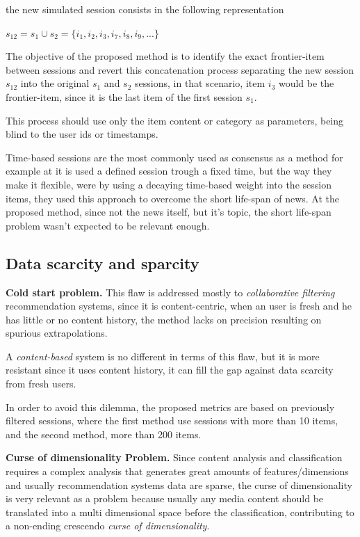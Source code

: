 \documentclass[ecp,tc,english]{iiufrgs}
\begin{document}
        the new simulated session consists in the following representation
    
        \(s_{12} =  s_{1} \cup  s_{2} =  \{i_{1}, i_{2}, i_{3}, i_{7}, i_{8}, i_{9}, ...\}\)
    
        The objective of the proposed method is to identify the exact frontier-item between sessions and revert this concatenation process separating the new session  \(s_{12}\) into the original \(s_{1}\) and \(s_{2}\) sessions, in that scenario, item \(i_{3}\) would be the frontier-item, since it is the last item of the first session \(s_{1}\).
    
        This process should use only the item content or category as parameters, being blind to the user ids or timestamps.
        
        Time-based sessions are the most commonly used as consensus as a method for example at \cite{sottocornola2018} it is used a defined session trough a fixed time, but the way they make it flexible, were by using a decaying time-based weight into the session items, they used this approach to overcome the short life-span of news. At the proposed method, since not the news itself, but it's topic, the short life-span problem wasn't expected to be relevant enough.
    
        \subsection{Data scarcity and sparcity} \label{data_scarcity_and_sparcity}
        \textbf{Cold start problem.} This flaw is addressed mostly to \textit{collaborative filtering} recommendation systems, since it is content-centric, when an user is fresh and he has little or no content history, the method lacks on precision resulting on spurious extrapolations.
    
        A \textit{content-based} system is no different in terms of this flaw, but it is more resistant since it uses content history, it can fill the gap against data scarcity from fresh users.
        
        In order to avoid this dilemma, the proposed metrics are based on previously filtered sessions, where the first method use sessions with more than 10 items, and the second method, more than 200 items.
    
        \textbf{Curse of dimensionality Problem.} Since content analysis and classification requires a complex analysis that generates great amounts of features/dimensions and usually recommendation systems data are sparse, the curse of dimensionality \cite{marimont1979} is very relevant as a problem because usually any media content should be translated into a multi dimensional space before the classification, contributing to a non-ending crescendo \textit{curse of dimensionality}.
\end{document}
